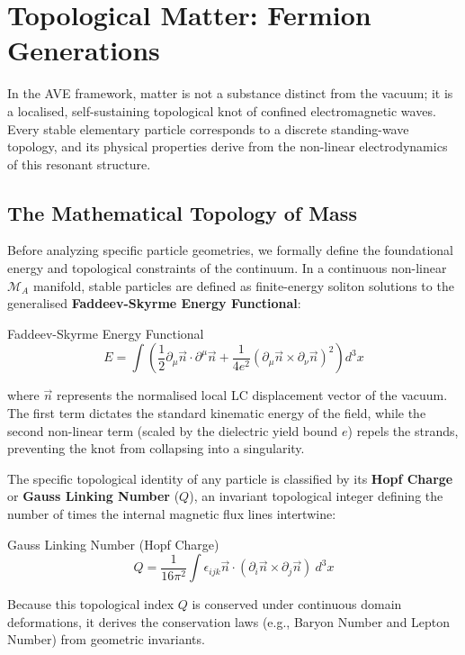 \chapter{Topological Matter: Fermion Generations}
\label{ch:topological_matter}

In the AVE framework, matter is not a substance distinct from the vacuum; it is a localised, self-sustaining topological knot of confined electromagnetic waves. Every stable elementary particle corresponds to a discrete standing-wave topology, and its physical properties derive from the non-linear electrodynamics of this resonant structure.

\section{The Mathematical Topology of Mass}
Before analyzing specific particle geometries, we formally define the foundational energy and topological constraints of the continuum. In a continuous non-linear $\mathcal{M}_A$ manifold, stable particles are defined as finite-energy soliton solutions to the generalised \textbf{Faddeev-Skyrme Energy Functional}:
\begin{resultbox}{Faddeev-Skyrme Energy Functional}
\begin{equation}
    E = \int \left( \frac{1}{2}\partial_\mu \vec{n} \cdot \partial^\mu \vec{n} + \frac{1}{4e^2}(\partial_\mu \vec{n} \times \partial_\nu \vec{n})^2 \right) d^3x
\end{equation}
\end{resultbox}
where $\vec{n}$ represents the normalised local LC displacement vector of the vacuum. The first term dictates the standard kinematic energy of the field, while the second non-linear term (scaled by the dielectric yield bound $e$) repels the strands, preventing the knot from collapsing into a singularity.

The specific topological identity of any particle is classified by its \textbf{Hopf Charge} or \textbf{Gauss Linking Number} ($Q$), an invariant topological integer defining the number of times the internal magnetic flux lines intertwine:
\begin{resultbox}{Gauss Linking Number (Hopf Charge)}
\begin{equation}
    Q = \frac{1}{16\pi^2} \int \epsilon_{ijk} \vec{n} \cdot (\partial_i \vec{n} \times \partial_j \vec{n}) \ d^3x
\end{equation}
\end{resultbox}
Because this topological index $Q$ is conserved under continuous domain deformations, it derives the conservation laws (e.g., Baryon Number and Lepton Number) from geometric invariants.

